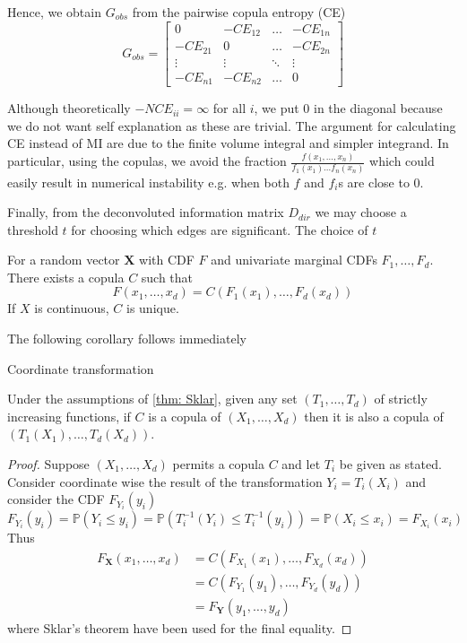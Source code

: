 \documentclass[../Thesis.tex]{subfiles}
\begin{document}
Hence, we obtain $G_{obs}$ from the pairwise copula entropy (CE)
$$G_{obs} = \begin{bmatrix}
        0        & - CE_{12} & \dots  & - CE_{1n} \\
        -CE_{21} & 0         & \dots  & - CE_{2n} \\
        \vdots   & \vdots    & \ddots & \vdots    \\
        -CE_{n1} & -CE_{n2}  & \dots  & 0
    \end{bmatrix}$$

Although theoretically $-NCE_{ii} = \infty$ for all $i$, we put $0$ in the diagonal because we do not want self explanation as these are trivial. The argument for calculating CE instead of MI are due to the finite volume integral and simpler integrand. In particular, using the copulas, we avoid the fraction $\frac{f(x_1,\dots,x_n)}{f_1(x_1)\dots f_n(x_n)}$ which could easily result in numerical instability e.g. when both $f$ and $f_i$s are close to 0.

Finally, from the deconvoluted information matrix $D_{dir}$ we may choose a threshold $t$ for choosing which edges are significant. The choice of $t$


\newpage
\begin{theorem} \label{thm: Sklar}
    For a random vector $\boldsymbol X$ with CDF $F$ and univariate marginal CDFs $F_1, \dots, F_d$. There exists a copula $C$ such that
    $$ F(x_1,\dots,x_d) = C(F_1(x_1), \dots, F_d(x_d)) $$
    If $X$ is continuous, $C$ is unique.
\end{theorem}

The following corollary follows immediately
\begin{corollary} \label{coro: Coordinate transformation}
    Coordinate transformation

    Under the assumptions of \autoref{thm: Sklar}, given any set $(T_1, \dots, T_d)$ of strictly increasing functions, if $C$ is a copula of $(X_1,\dots, X_d)$ then it is also a copula of $(T_1(X_1), \dots, T_d(X_d))$.
\end{corollary}

\begin{proof}
    Suppose $(X_1 , \dots , X_d)$ permits a copula $C$ and let $T_i$ be given as stated. Consider coordinate wise the result of the transformation $Y_i = T_i(X_i)$ and consider the CDF $F_{Y_i}(y_i)$
    $$F_{Y_i}(y_i) = \mathbb{P}\left(Y_i \leq y_i\right) = \mathbb{P}\left(T_i^{-1}(Y_i) \leq T_i^{-1}(y_i)\right) = \mathbb{P}\left(X_i \leq x_i\right) = F_{X_i}(x_i)$$
    Thus
    \begin{align*}
        F_{\boldsymbol X} (x_1,\dots , x_d) & = C\left( F_{X_1}(x_1), \dots, F_{X_d}(x_d)\right) \\
                                            & = C\left( F_{Y_1}(y_1), \dots, F_{Y_d}(y_d)\right) \\
                                            & = F_{\boldsymbol Y}(y_1, \dots, y_d)
    \end{align*}
    where Sklar's theorem have been used for the final equality.
\end{proof}
\end{document}
